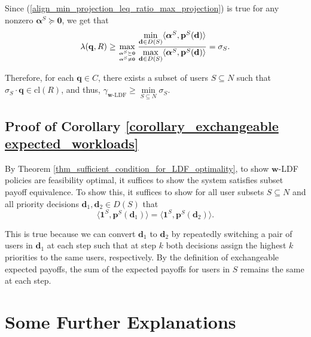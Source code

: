 \documentclass[prodmode,acmtompecs]{acmsmall}
\newcommand{\reqvec}{\mathbf{q}}
\newcommand{\fullUserSet}{N}
\newcommand{\myComments}[1]{}
\newif\ifdissertation
\newcommand{\dissertationStart}{\ifdissertation  \myComments{Dissertation version: }}
\begin{document}
Since (\ref{align_min_projection_leq_ratio_max_projection}) is true for any nonzero $\boldsymbol{\alpha}^{S} \succeq \mathbf{0}$, we get that
$$
\lambda(\reqvec, R) \geq 
\max\limits_{{\boldsymbol{\alpha}^S \succeq \mathbf{0}} \atop {\boldsymbol{\alpha}^S \neq \mathbf{0}}}
\frac{\min\limits_{\mathbf{d} \in D(S)} \langle \boldsymbol{\alpha}^{S}, \mathbf{p}^{S}(\mathbf{d}) \rangle}
{\max\limits_{\mathbf{d} \in D(S)} \langle \boldsymbol{\alpha}^{S}, \mathbf{p}^{S}(\mathbf{d}) \rangle}
= \sigma_{S}. 
$$

Therefore, for each $\reqvec \in C$, there exists a subset of users $S \subseteq \fullUserSet$ such that $\sigma_S \cdot \reqvec \in \text{cl}(R)$, and thus,
$\gamma_{\mathbf{w}\text{-LDF}} \geq \min\limits_{S \subseteq \fullUserSet} \sigma_S$. 

\subsection{Proof of Corollary \ref{corollary_exchangeable expected_workloads}}
\label{appendix_pf_corollary_exchangeable expected_workloads}
By Theorem \ref{thm_sufficient_condition_for_LDF_optimality}, to show $\mathbf{w}$-LDF policies are feasibility optimal, it suffices to show the system satisfies subset payoff equivalence. To show this, it suffices to show for all user subsets $S \subseteq \fullUserSet$ and all priority decisions $\mathbf{d}_1, \mathbf{d}_2 \in D(S)$ that 
$$
\langle \mathbf{1}^S, \mathbf{p}^S(\mathbf{d}_1) \rangle = \langle \mathbf{1}^S, \mathbf{p}^S(\mathbf{d}_2) \rangle. 
$$

This is true because we can convert $\mathbf{d}_1$ to $\mathbf{d}_2$ by repeatedly switching a pair of users in $\mathbf{d}_1$ at each step such that at step $k$ both decisions assign the highest $k$ priorities to the same users, respectively. By the definition of exchangeable expected payoffs, the sum of the expected payoffs for users in $S$ remains the same at each step. 





\dissertationStart
\appendix
\section{Some Further Explanations}
\end{document}

